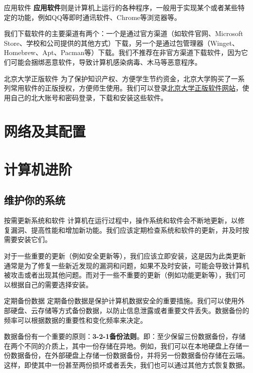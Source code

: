 \documentclass{beamer}
\begin{document}
\begin{frame}{应用软件}
    \textbf{应用软件}则是计算机上运行的各种程序，一般用于实现某个或者某些特定的功能，例如QQ等即时通讯软件、Chrome等浏览器等。

    我们下载软件的主要渠道有两个：一个是通过官方渠道（如软件官网、Microsoft Store、学校和公司提供的其他方式）下载，另一个是通过包管理器（Winget、Homebrew、Apt、Pacman等）下载。我们不推荐在非官方渠道下载软件，因为它们可能会捆绑恶意软件，导致计算机感染病毒、木马等恶意程序。
\end{frame}

\begin{frame}{北京大学正版软件}
    为了保护知识产权、方便学生节约资金，北京大学购买了一系列常用软件的正版授权，方便师生使用。我们可以登录\href{https://software.pku.edu.cn/}{北京大学正版软件网站}，使用自己的北大账号和密码登录，下载和安装这些软件。
\end{frame}

\section{网络及其配置}


\section{计算机进阶}

\subsection{维护你的系统}
\begin{frame}{按需更新系统和软件} 
    计算机在运行过程中，操作系统和软件会不断地更新，以修复漏洞、提高性能和增加新功能。我们应该定期检查系统和软件的更新，并及时按需要安装它们。

    对于一些重要的更新（例如安全更新等），我们应该立即安装，这是因为此类更新通常是为了修复一些新近发现的漏洞和问题，如果不及时安装，可能会导致计算机被攻击或者出现其他问题。而对于一些不重要的更新（例如功能更新等），我们可以根据自己的需要选择安装。
\end{frame}

\begin{frame}{定期备份数据}
    定期备份数据是保护计算机数据安全的重要措施。我们可以使用外部硬盘、云存储等方式备份数据，以防止信息泄露或者重要文件丢失。数据备份的频率可以根据数据的重要性和变化频率来决定。

    数据备份有一个重要的原则：\textbf{3-2-1备份法则}。即：至少保留三份数据备份，存储在两个不同的介质上，其中一份存储在异地。例如，我们可以在本地硬盘上存储一份数据备份，在外部硬盘上存储一份数据备份，并将另一份数据备份存储在云端。这样，即使其中一份甚至两份损坏或者丢失，我们也可以通过其他方式恢复数据。
\end{frame}
\end{document}
